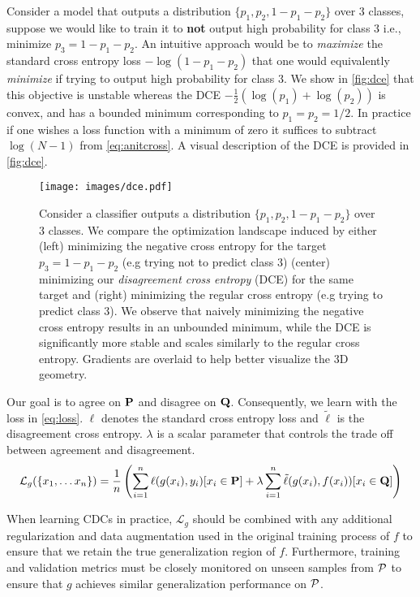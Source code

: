 Consider a model that outputs a distribution $\{p_1, p_2, 1-p_1-p_2\}$ over $3$ classes, suppose we would like to train it to \textbf{not} output high probability for class $3$ i.e., minimize $p_3=1-p_1-p_2$.
An intuitive approach would be to \textit{maximize} the standard cross entropy loss $-\log(1-p_1-p_2)$ that one would equivalently \textit{minimize} if trying to output high probability for class $3$.
We show in \autoref{fig:dce} that this objective is unstable whereas the DCE $-\frac{1}{2}(\log(p_1) + \log(p_2))$ is convex, and has a bounded minimum corresponding to $p_1=p_2=1/2$.
In practice if one wishes a loss function with a minimum of zero it suffices to subtract $ \log(N-1)$ from \autoref{eq:anitcross}.
A visual description of the DCE is provided in \autoref{fig:dce}.
\begin{figure}[!htb]
    \centering
    \texttt{[image: images/dce.pdf]}
    \caption{Consider a classifier outputs a distribution $\{p_1, p_2, 1-p_1-p_2\}$ over $3$ classes. We compare the optimization landscape induced by either (left) minimizing the negative cross entropy for the target $p_3=1-p_1-p_2$ (e.g trying not to predict class $3$) (center) minimizing our \textit{disagreement cross entropy} (DCE) for the same target
    and (right) minimizing the regular cross entropy (e.g trying to predict class $3$). We observe that naively minimizing the negative cross entropy results in an unbounded minimum, while the DCE is significantly more stable and scales similarly to the regular cross entropy. Gradients are overlaid to help better visualize the 3D geometry.}
    \label{fig:dce}
\end{figure}

Our goal is to agree on $\mathbf{P}$ and disagree on $\mathbf{Q}$.
Consequently, we learn with the loss in \autoref{eq:loss}. $\ell$ denotes the standard cross entropy loss and $\tilde{\ell}$ is the disagreement cross entropy. $\lambda$ is a scalar parameter that controls the trade off between agreement and disagreement.
\begin{equation}
    \mathcal{L}_g(\{x_1, \ldots x_n\}) = \frac{1}{n}\left(\sum_{i=1}^n \ell(g(x_i), y_i)[x_i\in \mathbf{P}] + \lambda\sum_{i=1}^n \tilde{\ell}(g(x_i), f(x_i))[x_i\in \mathbf{Q}] \right)
    \label{eq:loss}
\end{equation}

When learning CDCs in practice, $\mathcal{L}_g$ should be combined with any additional regularization and data augmentation used in the original training process of $f$ to ensure that we retain the true generalization region of $f$.
Furthermore, training and validation metrics must be closely monitored on unseen samples from $\mathcal{P}$ to ensure that $g$ achieves similar generalization performance on $\mathcal{P}$.


